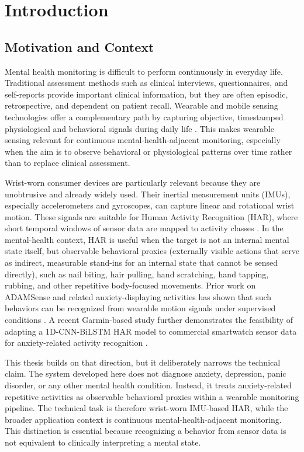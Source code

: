 \chapter{Introduction}
\label{chap:introduction}
\section{Motivation and Context}

Mental health monitoring is difficult to perform continuously in everyday life. Traditional assessment methods such as clinical interviews, questionnaires, and self-reports provide important clinical information, but they are often episodic, retrospective, and dependent on patient recall. Wearable and mobile sensing technologies offer a complementary path by capturing objective, timestamped physiological and behavioral signals during daily life \cite{abdalrazaq2023wearable,gomes2023mentalhealth,oleh2025ragmentalhealth,shen2025passivesensing}. This makes wearable sensing relevant for continuous mental-health-adjacent monitoring, especially when the aim is to observe behavioral or physiological patterns over time rather than to replace clinical assessment.

Wrist-worn consumer devices are particularly relevant because they are unobtrusive and already widely used. Their inertial measurement units (IMUs), especially accelerometers and gyroscopes, can capture linear and rotational wrist motion. These signals are suitable for Human Activity Recognition (HAR), where short temporal windows of sensor data are mapped to activity classes \cite{lara2013survey,bulling2014tutorial}. In the mental-health context, HAR is useful when the target is not an internal mental state itself, but observable behavioral proxies (externally visible actions that serve as indirect, measurable stand-ins for an internal state that cannot be sensed directly), such as nail biting, hair pulling, hand scratching, hand tapping, rubbing, and other repetitive body-focused movements. Prior work on ADAMSense and related anxiety-displaying activities has shown that such behaviors can be recognized from wearable motion signals under supervised conditions \cite{khan2021adamsense}. A recent Garmin-based study further demonstrates the feasibility of adapting a 1D-CNN-BiLSTM HAR model to commercial smartwatch sensor data for anxiety-related activity recognition \cite{oleh2025recognition}.

This thesis builds on that direction, but it deliberately narrows the technical claim. The system developed here does not diagnose anxiety, depression, panic disorder, or any other mental health condition. Instead, it treats anxiety-related repetitive activities as observable behavioral proxies within a wearable monitoring pipeline. The technical task is therefore wrist-worn IMU-based HAR, while the broader application context is continuous mental-health-adjacent monitoring. This distinction is essential because recognizing a behavior from sensor data is not equivalent to clinically interpreting a mental state.

